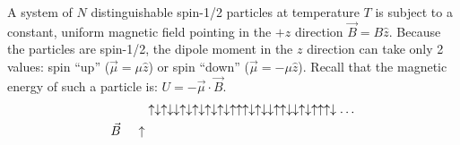 \question \normalsize A system of $N$ distinguishable spin-1/2 particles at temperature $T$ is subject to a constant, uniform magnetic field pointing in the $+z$ direction $\vec{B}=B\hat{z}$. Because the particles are spin-1/2, the dipole moment in the $z$ direction can take only 2 values: spin ``up'' ($\vec{\mu}=\mu\hat{z}$) or spin ``down'' ($\vec{\mu}=-\mu\hat{z}$). Recall that the magnetic energy of such a particle is: $U=-\vec{\mu}\cdot\vec{B}$.
\vspace{1cm}
\begin{align*}
	&\uparrow\downarrow\uparrow\downarrow\downarrow\uparrow\downarrow\uparrow\downarrow\uparrow\downarrow\uparrow\downarrow\uparrow\uparrow\uparrow\downarrow\uparrow\downarrow\downarrow\uparrow\uparrow\downarrow\downarrow\uparrow\downarrow\uparrow\uparrow\uparrow\downarrow\ldots\\
	\vec{B}\hspace{.5cm}\mathbf{\uparrow}
\end{align*}


